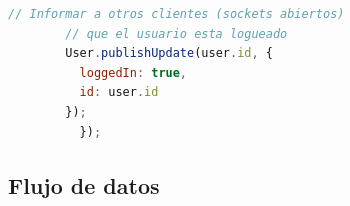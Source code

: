 \documentclass[xcolor=x11names,compress]{beamer}
\theoremstyle{cuadrado}
\begin{document}
{\begin{frame}[fragile]
\begin{adjustwidth}{-8em}{-1em}
\begin{lstlisting}[language=JavaScript]
		// Informar a otros clientes (sockets abiertos) 
		// que el usuario esta logueado
		User.publishUpdate(user.id, {
		  loggedIn: true,
		  id: user.id
		});
	      });

      \end{lstlisting}
\end{adjustwidth}

\end{frame}



\subsection{Flujo de datos}




\frame{\frametitle{\textcolor{black}{ Comunicaciones - Flujo de datos }}

}}
\end{document}
